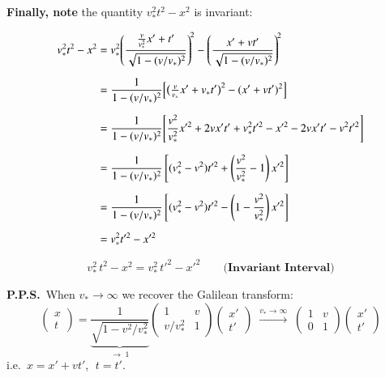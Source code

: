 \textbf{Finally, note} the quantity $v_*^2 t^2 - x^2$ is invariant:

\begin{align*}
  v_*^2 t^2 - x^2
  &= v_*^2\!\left(\frac{\frac{v}{v_*^2}x'+t'}{\sqrt{1-(v/v_*)^2}}\right)^{\!2}
   - \left(\frac{x'+vt'}{\sqrt{1-(v/v_*)^2}}\right)^{\!2} \\[6pt]
  &= \frac{1}{1-(v/v_*)^2}
     \Bigl[
       \bigl(\tfrac{v}{v_*}x'+v_*t'\bigr)^2 - (x'+vt')^2
     \Bigr] \\[6pt]
  &= \frac{1}{1-(v/v_*)^2}
     \Biggl[
       \frac{v^2}{v_*^2}x'^2 + 2vx't' + v_*^2 t'^2
       - x'^2 - 2vx't' - v^2 t'^2
     \Biggr] \\[6pt]
  &= \frac{1}{1-(v/v_*)^2}
     \left[
       (v_*^2 - v^2)t'^2 + \left(\frac{v^2}{v_*^2}-1\right)x'^2
     \right] \\[6pt]
  &= \frac{1}{1-(v/v_*)^2}
     \left[
       (v_*^2-v^2)t'^2 - \left(1-\frac{v^2}{v_*^2}\right)x'^2
     \right] \\[6pt]
  &= v_*^2 t'^2 - x'^2
\end{align*}

\begin{tcolorbox}
\[
  v_*^2\,t^2 - x^2 = v_*^2\,t'^2 - x'^2 \qquad \textbf{(Invariant Interval)}
\]
\end{tcolorbox}

\textbf{P.P.S.}\ When $v_*\to\infty$ we recover the Galilean transform:
\[
  \begin{pmatrix}x\\t\end{pmatrix}
  = \underbrace{\frac{1}{\sqrt{1-v^2/v_*^2}}}_{\to\;1}
    \begin{pmatrix}1 & v \\[4pt] v/v_*^2 & 1\end{pmatrix}
    \begin{pmatrix}x'\\t'\end{pmatrix}
  \;\xrightarrow{v_*\to\infty}\;
  \begin{pmatrix}1&v\\0&1\end{pmatrix}
  \begin{pmatrix}x'\\t'\end{pmatrix}
\]
i.e.\ $x = x' + vt'$, $\;t = t'$.


